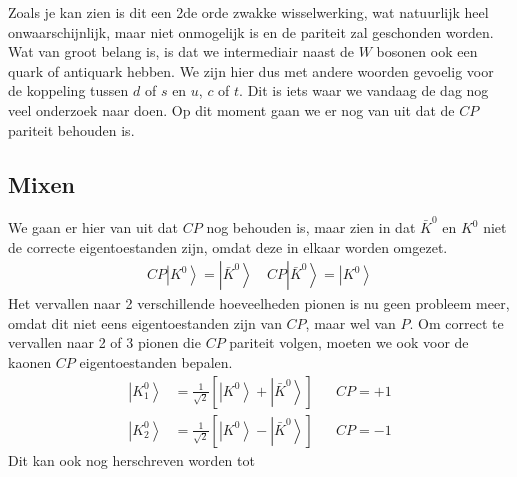 \documentclass[../main.tex]{subfiles}
\begin{document}
Zoals je kan zien is dit een 2de orde zwakke wisselwerking, wat natuurlijk heel onwaarschijnlijk, maar niet onmogelijk is en de pariteit zal geschonden worden. Wat van groot belang is, is dat we intermediair naast de $W$ bosonen ook een quark of antiquark hebben. We zijn hier dus met andere woorden gevoelig voor de koppeling tussen $d$ of $s$ en $u$, $c$ of $t$. Dit is iets waar we vandaag de dag nog veel onderzoek naar doen. Op dit moment gaan we er nog van uit dat de $CP$ pariteit behouden is.

\subsection{Mixen}%
\label{sub:mixen}

We gaan er hier van uit dat $CP$ nog behouden is, maar zien in dat $\bar{K}^{0}$ en $K^{0}$ niet de correcte eigentoestanden zijn, omdat deze in elkaar worden omgezet.
\begin{equation}
    \begin{aligned}
        \label{eq:cp_anti_kaon}
        C P\left|K^{0}\right>=\left| \bar{K}^{0}\right>\quad C P\left|\bar{K}^{0}\right>=\left| K^{0}\right>
    \end{aligned}
\end{equation}
Het vervallen naar 2 verschillende hoeveelheden pionen is nu geen probleem meer, omdat dit niet eens eigentoestanden zijn van $CP$, maar wel van $P$. Om correct te vervallen naar 2 of 3 pionen die $CP$ pariteit volgen, moeten we ook voor de kaonen $CP$ eigentoestanden bepalen.
\begin{equation}
    \begin{aligned}
        \label{eq:kaon_cp_eigentoestanden}
        \left| K_{1}^{0}\right>&=\frac{1}{\sqrt{2}}\left[\left|K^{0}\right>+\left| \bar{K}^{0}\right>\right] & & C P=+1 \\
        \left| K_{2}^{0}\right>&=\frac{1}{\sqrt{2}}\left[\left|K^{0}\right>-\left| \bar{K}^{0}\right>\right] & & C P=-1
    \end{aligned}
\end{equation}
Dit kan ook nog herschreven worden tot
\end{document}
